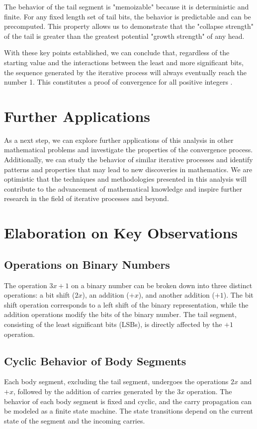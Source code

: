\documentclass{article}
\begin{document}
The behavior of the tail segment is "memoizable" because it is deterministic and finite. For any fixed length set of tail bits, the behavior is predictable and can be precomputed. This property allows us to demonstrate that the "collapse strength" of the tail is greater than the greatest potential "growth strength" of any head.

With these key points established, we can conclude that, regardless of the starting value and the interactions between the least and more significant bits, the sequence generated by the iterative process will always eventually reach the number 1. This constitutes a proof of convergence for all positive integers
.

\section{Further Applications}
As a next step, we can explore further applications of this analysis in other mathematical problems and investigate the properties of the convergence process. Additionally, we can study the behavior of similar iterative processes and identify patterns and properties that may lead to new discoveries in mathematics. We are optimistic that the techniques and methodologies presented in this analysis will contribute to the advancement of mathematical knowledge and inspire further research in the field of iterative processes and beyond.

\section{Elaboration on Key Observations}
\subsection{Operations on Binary Numbers}
The operation $3x + 1$ on a binary number can be broken down into three distinct operations: a bit shift ($2x$), an addition ($+x$), and another addition ($+1$). The bit shift operation corresponds to a left shift of the binary representation, while the addition operations modify the bits of the binary number. The tail segment, consisting of the least significant bits (LSBs), is directly affected by the $+1$ operation.

\subsection{Cyclic Behavior of Body Segments}
Each body segment, excluding the tail segment, undergoes the operations $2x$ and $+x$, followed by the addition of carries generated by the $3x$ operation. The behavior of each body segment is fixed and cyclic, and the carry propagation can be modeled as a finite state machine. The state transitions depend on the current state of the segment and the incoming carries.
\end{document}
